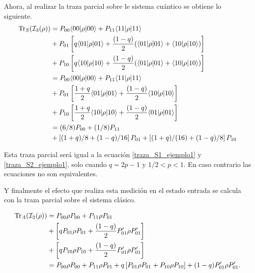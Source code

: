 Ahora, al realizar la traza parcial sobre le sistema cuántico se obtiene lo siguiente. 
\begin{equation}\label{traza_S3_ejemplo1}
    \begin{split}
        {\rm Tr}_S(\mathcal{I}_3(\rho)) 
        &=P_{00} \langle 00|\rho|00\rangle + P_{11} \langle 11|\rho|11\rangle\\
        &+P_{01}  \left[q \langle 01|\rho| 01\rangle+ \frac{(1-q)}{2} (\langle 01|\rho |01\rangle +\langle 10 |\rho |10\rangle)\right] \\
        &+P_{10}  \left[q \langle 10|\rho| 10\rangle+ \frac{(1-q)}{2} (\langle 01|\rho| 01\rangle +\langle 10 |\rho |10\rangle)\right] \\
        &=P_{00} \langle 00|\rho|00\rangle + P_{11} \langle 11|\rho|11\rangle\\
        &+P_{01}  \left[\frac{1+q}{2}\langle 01|\rho| 01\rangle+ \frac{(1-q)}{2} \langle 10 |\rho |10\rangle\right] \\
        &+P_{10}  \left[\frac{1+q}{2}\langle 10|\rho| 10\rangle+ \frac{(1-q)}{2} \langle 01 |\rho |01\rangle\right] \\
        &=(6/8)P_{00} + (1/8)P_{11}\\
        &+  \left[(1+q)/8+ (1-q)/16\right] P_{01}+  \left[(1+q)/(16)+ (1-q)/8 \right] P_{10}\\
    \end{split}
\end{equation}

Esta traza parcial será igual a la ecuación {\ref{traza_S1_ejemplo1}} y {\ref{traza_S2_ejemplo1}}, solo cuando $q=2p-1$ y $1/2<p<1$. En caso contrario las ecuaciones no son equivalentes. 

Y finalmente el efecto que realiza esta medición en el estado entrada se calcula con la traza parcial sobre el sistema clásico.


\begin{equation}\label{traza_A3_ejemplo1}
    \begin{split}
        {\rm Tr}_A(\mathcal{I}_3(\rho)) &=P_{00} \rho P_{00} + P_{11} \rho P_{01}\\
        &+\left[qP_{01}\rho P_{01}+ \frac{(1-q)}{2} P'_{01}\rho P'_{01}\right] \\
        &+\left[qP_{10}\rho P_{10}+ \frac{(1-q)}{2} P'_{01}\rho P'_{01}\right]\\
        &=P_{00} \rho P_{00} + P_{11} \rho P_{01}+q\left[P_{01}\rho P_{01}+ P_{10}\rho P_{10}\right]+{(1-q)} P'_{01}\rho P'_{01}.\\
    \end{split}
\end{equation}



